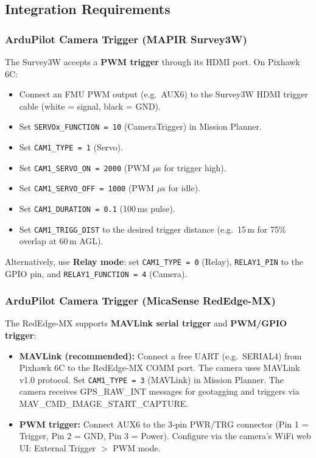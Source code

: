 \documentclass[11pt,a4paper]{article}
\begin{document}
\subsection{Integration Requirements}

\subsubsection{ArduPilot Camera Trigger (MAPIR Survey3W)}

The Survey3W accepts a \textbf{PWM trigger} through its HDMI port. On Pixhawk 6C:

\begin{itemize}
\item Connect an FMU PWM output (e.g.\ AUX6) to the Survey3W HDMI trigger cable (white = signal, black = GND).
\item Set \texttt{SERVOx\_FUNCTION = 10} (CameraTrigger) in Mission Planner.
\item Set \texttt{CAM1\_TYPE = 1} (Servo).
\item Set \texttt{CAM1\_SERVO\_ON = 2000} (PWM $\mu$s for trigger high).
\item Set \texttt{CAM1\_SERVO\_OFF = 1000} (PWM $\mu$s for idle).
\item Set \texttt{CAM1\_DURATION = 0.1} (100\,ms pulse).
\item Set \texttt{CAM1\_TRIGG\_DIST} to the desired trigger distance (e.g.\ 15\,m for 75\% overlap at 60\,m AGL).
\end{itemize}

Alternatively, use \textbf{Relay mode}: set \texttt{CAM1\_TYPE = 0} (Relay), \texttt{RELAY1\_PIN} to the GPIO pin, and \texttt{RELAY1\_FUNCTION = 4} (Camera).

\subsubsection{ArduPilot Camera Trigger (MicaSense RedEdge-MX)}

The RedEdge-MX supports \textbf{MAVLink serial trigger} and \textbf{PWM/GPIO trigger}:

\begin{itemize}
\item \textbf{MAVLink (recommended):} Connect a free UART (e.g.\ SERIAL4) from Pixhawk 6C to the RedEdge-MX COMM port. The camera uses MAVLink v1.0 protocol. Set \texttt{CAM1\_TYPE = 3} (MAVLink) in Mission Planner. The camera receives GPS\_RAW\_INT messages for geotagging and triggers via MAV\_CMD\_IMAGE\_START\_CAPTURE.
\item \textbf{PWM trigger:} Connect AUX6 to the 3-pin PWR/TRG connector (Pin 1 = Trigger, Pin 2 = GND, Pin 3 = Power). Configure via the camera's WiFi web UI: External Trigger $>$ PWM mode.
\end{itemize}
\end{document}

